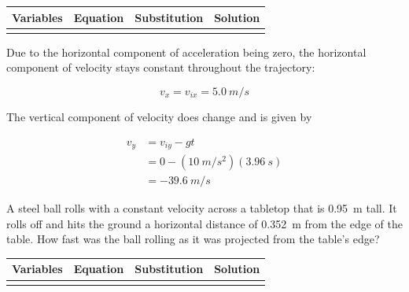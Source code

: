 \documentclass[../main-physics-problems.tex]{subfiles}
\begin{document}
\begin{questions}
\begin{parts}
\begin{center}
\begin{table}[h!]
\centering
\renewcommand{\arraystretch}{1.2} %
\setlength{\extrarowheight}{0pt}  %
\begin{tabular}{|>{\centering\arraybackslash}m{3cm}|>{\centering\arraybackslash}m{4cm}|>{\centering\arraybackslash}m{4.5cm}|>{\centering\arraybackslash}m{3cm}|} 
\hline
\textbf{Variables} & \textbf{Equation} & \textbf{Substitution} & \textbf{Solution} \\
\hline
\rule{0pt}{4.5cm} & & & \\
\hline
\end{tabular}
\end{table}
\end{center}

\begin{solution}
Due to the horizontal component of acceleration being zero, the horizontal component of velocity stays constant throughout the trajectory:

\begin{equation*}
    \boxed{v_{x} = v_{ix} = \SI{5.0}{m/s}}
\end{equation*}

The vertical component of velocity does change and is given by

\begin{align*}
    v_y &= v_{iy} - gt \\[1ex]
    &= 0 - \left(\SI{10}{m/s^2}\right)(\SI{3.96}{s}) \\[1ex]
    &= \boxed{-\SI{39.6}{m/s}}
\end{align*}
\end{solution}
\end{parts}

\question
A steel ball rolls with a constant velocity across a tabletop that is \SI{0.95}{m} tall. It rolls off and hits the ground a horizontal distance of \SI{0.352}{m} from the edge of the table. How fast was the ball rolling as it was projected from the table's edge?

\begin{center}
\begin{table}[h!]
\centering
\renewcommand{\arraystretch}{1.2} %
\setlength{\extrarowheight}{0pt}  %
\begin{tabular}{|>{\centering\arraybackslash}m{3cm}|>{\centering\arraybackslash}m{4cm}|>{\centering\arraybackslash}m{4.5cm}|>{\centering\arraybackslash}m{3cm}|} 
\hline
\textbf{Variables} & \textbf{Equation} & \textbf{Substitution} & \textbf{Solution} \\
\hline
\rule{0pt}{4cm} & & & \\
\hline
\end{tabular}
\end{table}
\vspace{-2em}
\end{center}


\end{questions}
\end{document}
